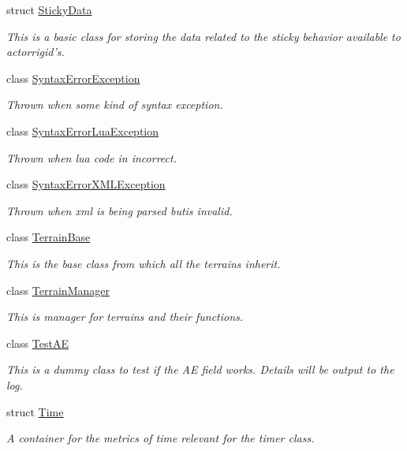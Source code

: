 \begin{DoxyCompactItemize}
struct \hyperlink{structMezzanine_1_1StickyData}{Sticky\-Data}
\begin{DoxyCompactList}\small\item\em This is a basic class for storing the data related to the sticky behavior available to actorrigid's. \end{DoxyCompactList}\item 
class \hyperlink{classMezzanine_1_1SyntaxErrorException}{Syntax\-Error\-Exception}
\begin{DoxyCompactList}\small\item\em Thrown when some kind of syntax exception. \end{DoxyCompactList}\item 
class \hyperlink{classMezzanine_1_1SyntaxErrorLuaException}{Syntax\-Error\-Lua\-Exception}
\begin{DoxyCompactList}\small\item\em Thrown when lua code in incorrect. \end{DoxyCompactList}\item 
class \hyperlink{classMezzanine_1_1SyntaxErrorXMLException}{Syntax\-Error\-X\-M\-L\-Exception}
\begin{DoxyCompactList}\small\item\em Thrown when xml is being parsed butis invalid. \end{DoxyCompactList}\item 
class \hyperlink{classMezzanine_1_1TerrainBase}{Terrain\-Base}
\begin{DoxyCompactList}\small\item\em This is the base class from which all the terrains inherit. \end{DoxyCompactList}\item 
class \hyperlink{classMezzanine_1_1TerrainManager}{Terrain\-Manager}
\begin{DoxyCompactList}\small\item\em This is manager for terrains and their functions. \end{DoxyCompactList}\item 
class \hyperlink{classMezzanine_1_1TestAE}{Test\-A\-E}
\begin{DoxyCompactList}\small\item\em This is a dummy class to test if the A\-E field works. Details will be output to the log. \end{DoxyCompactList}\item 
struct \hyperlink{structMezzanine_1_1Time}{Time}
\begin{DoxyCompactList}\small\item\em A container for the metrics of time relevant for the timer class. \end{DoxyCompactList}\item 

\end{DoxyCompactItemize}

